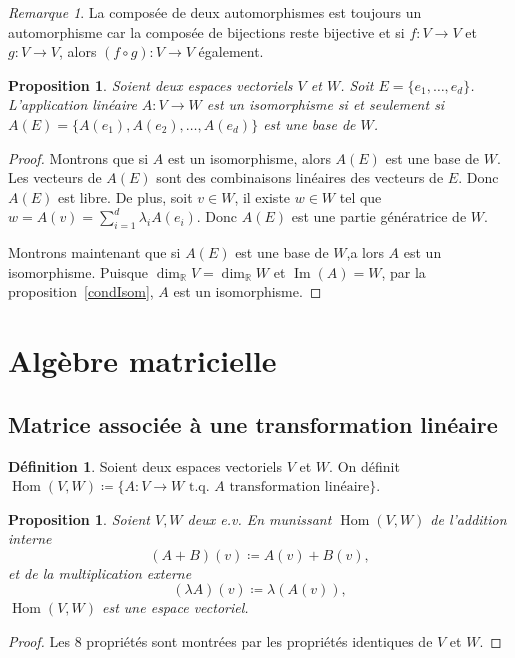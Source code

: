 \documentclass{article}
\DeclareMathOperator{\Imf}{Im}
\DeclareMathOperator{\Hom}{Hom}
\newcommand{\R}{\mathbb R}
\newcommand{\tq}{\textrm{ t.q. }}
\newtheorem{prp}[thm]{Proposition}
\theoremstyle{definition}
\newtheorem{déf}[thm]{Définition}
\theoremstyle{remark}
\newtheorem*{rmq}{Remarque}
\begin{document}
		\begin{rmq} La composée de deux automorphismes est toujours un automorphisme car la composée de bijections reste bijective et si $f : V \to V$ et $g : V \to V$,
		alors $(f \circ g) : V \to V$ également. \end{rmq}

		\begin{prp} Soient deux espaces vectoriels $V$ et $W$. Soit $E = \{e_1, \dotsc, e_d\}$. L'application linéaire $A : V \to W$ est un isomorphisme si et
		seulement si $A(E) = \{A(e_1), A(e_2), \dotsc, A(e_d)\}$ est une base de $W$. \end{prp}

		\begin{proof} Montrons que si $A$ est un isomorphisme, alors $A(E)$ est une base de $W$. Les vecteurs de $A(E)$ sont des combinaisons linéaires des vecteurs
		de $E$. Donc $A(E)$ est libre. De plus, soit $v \in W$, il existe $w \in W$ tel que $w = A(v) = \sum_{i=1}^d\lambda_iA(e_i)$. Donc $A(E)$ est une partie
		génératrice de $W$.

		Montrons maintenant que si $A(E)$ est une base de $W$,a lors $A$ est un isomorphisme. Puisque $\dim_\R V = \dim_\R W$ et $\Imf(A) = W$, par la
		proposition~\ref{condIsom}, $A$ est un isomorphisme. \end{proof}

\newpage
\section{Algèbre matricielle}
	\subsection{Matrice associée à une transformation linéaire}
		\begin{déf} Soient deux espaces vectoriels $V$ et $W$. On définit $\Hom(V, W) \coloneqq \{A : V \to W \tq A \text { transformation linéaire}\}$. \end{déf}

		\begin{prp} Soient $V, W$ deux e.v. En munissant $\Hom(V, W)$ de l'addition interne \[(A+B)(v) \coloneqq A(v) + B(v),\] et de la multiplication externe
		\[(\lambda A)(v) \coloneqq \lambda(A(v)),\] $\Hom(V, W)$ est une espace vectoriel. \end{prp}

		\begin{proof} Les 8 propriétés sont montrées par les propriétés identiques de $V$ et $W$. \end{proof}
\end{document}
